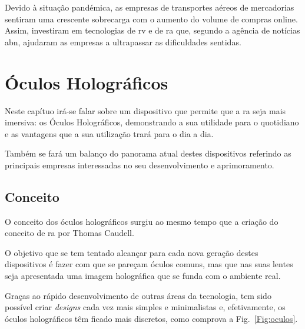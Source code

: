 \documentclass{report}
\begin{document}
Devido à situação pandémica, as empresas de transportes aéreos de mercadorias sentiram uma crescente sobrecarga com o aumento do volume de compras online. Assim, investiram em tecnologias de \ac{rv} e de \ac{ra} que, segundo a agência de notícias \ac{abn}, ajudaram as empresas a ultrapassar as dificuldades sentidas.\cite{moody_2020}

\chapter{Óculos Holográficos}
\label{chap.oculos-holograficos}
Neste capítuo irá-se falar sobre um dispositivo que permite que a \ac{ra} seja mais imersiva: os Óculos Holográficos, demonstrando a sua utilidade para o quotidiano e as vantagens que a sua utilização trará para o dia a dia.

Também se fará um balanço do panorama atual destes dispositivos referindo as principais empresas interessadas no seu desenvolvimento e aprimoramento.

\section{Conceito}
O conceito dos óculos holográficos surgiu ao mesmo tempo que a criação do conceito de \ac{ra} por Thomas Caudell.

O objetivo que se tem tentado alcançar para cada nova geração destes dispositivos é fazer com que se pareçam óculos comuns, mas que nas suas lentes seja apresentada uma imagem holográfica que se funda com o ambiente real.

Graças ao rápido desenvolvimento de outras áreas da tecnologia, tem sido possível criar \textit{designs} cada vez mais simples e minimalistas e, efetivamente, os óculos holográficos têm ficado mais discretos, como comprova a Fig.~\ref{Fig:oculos}.
\end{document}
